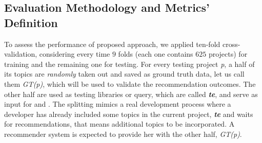 	\subsection{Evaluation Methodology and Metrics’ Definition}\label{sec:methodology-metric}
To assess the performance of \CR proposed approach, we applied ten-fold cross-validation, considering every time $9$ folds (each one contains $625$ projects) for training and the remaining one for testing. 
	For every testing project \emph{p}, a half of its topics are \emph{randomly} 
	taken out and saved as ground truth data, let us call them \emph{GT(p)}, which will be used to validate the recommendation outcomes. The other half are used 
	as testing libraries or query, which are called \emph{\textbf{te}}, and serve 
	as input for  and . %
The splitting mimics a real development process where a 
developer has already included some topics in the current project, \ie 
\emph{\textbf{te}} and waits for recommendations, that means additional topics to be incorporated. A recommender system is expected to provide her 
with the other half, \ie \emph{GT(p)}. %




